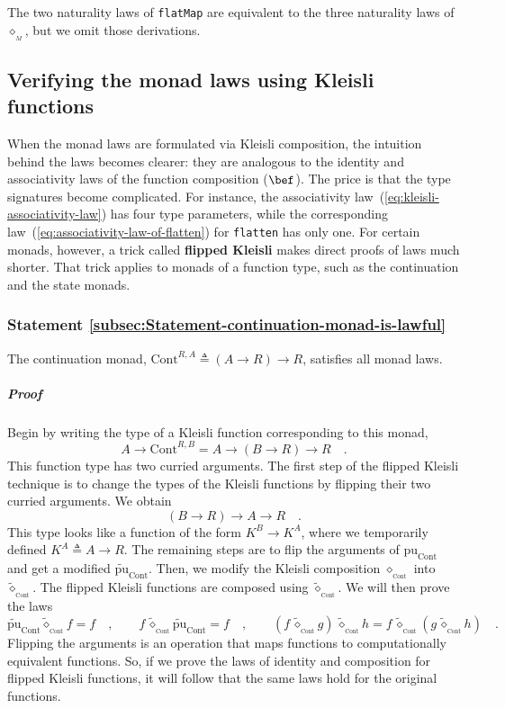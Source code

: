 The two naturality laws of \lstinline!flatMap! are equivalent to
the three naturality laws of $\diamond_{_{M}}$, but we omit those
derivations. 

\subsection{Verifying the monad laws using Kleisli functions}

When the monad laws are formulated via Kleisli composition, the intuition
behind the laws becomes clearer: they are analogous to the identity
and associativity laws of the function composition ($\bef$). The
price is that the type signatures become complicated. For instance,
the associativity law~(\ref{eq:kleisli-associativity-law}) has four
type parameters, while the corresponding law~(\ref{eq:associativity-law-of-flatten})
for \lstinline!flatten! has only one. For certain monads, however,
a trick called \textbf{flipped
Kleisli} makes direct proofs of laws much shorter. That trick applies
to monads of a function type, such as the continuation and the state
monads.

\subsubsection{Statement \label{subsec:Statement-continuation-monad-is-lawful}\ref{subsec:Statement-continuation-monad-is-lawful}}

The continuation monad, $\text{Cont}^{R,A}\triangleq\left(A\rightarrow R\right)\rightarrow R$,
satisfies all monad laws.

\subparagraph{Proof}

Begin by writing the type of a Kleisli function corresponding to this
monad,
\[
A\rightarrow\text{Cont}^{R,B}=A\rightarrow\left(B\rightarrow R\right)\rightarrow R\quad.
\]
This function type has two curried arguments. The first step of the
flipped Kleisli technique is to change the types of the Kleisli functions
by flipping their two curried arguments. We obtain
\[
\left(B\rightarrow R\right)\rightarrow A\rightarrow R\quad.
\]
This type looks like a function of the form $K^{B}\rightarrow K^{A}$,
where we temporarily defined $K^{A}\triangleq A\rightarrow R$. The
remaining steps are to flip the arguments of $\text{pu}_{\text{Cont}}$
and get a modified $\tilde{\text{pu}}_{\text{Cont}}$. Then, we modify
the Kleisli composition $\diamond_{_{\text{Cont}}}$ into $\tilde{\diamond}_{_{\text{Cont}}}$.
The flipped Kleisli functions are composed using $\tilde{\diamond}_{_{\text{Cont}}}$.
We will then prove the laws
\[
\tilde{\text{pu}}_{\text{Cont}}\tilde{\diamond}_{_{\text{Cont}}}f=f\quad,\quad\quad f\,\tilde{\diamond}_{_{\text{Cont}}}\tilde{\text{pu}}_{\text{Cont}}=f\quad,\quad\quad(f\,\tilde{\diamond}_{_{\text{Cont}}}g)\,\tilde{\diamond}_{_{\text{Cont}}}h=f\,\tilde{\diamond}_{_{\text{Cont}}}(g\,\tilde{\diamond}_{_{\text{Cont}}}h)\quad.
\]
Flipping the arguments is an operation that maps functions to computationally
equivalent functions. So, if we prove the laws of identity and composition
for flipped Kleisli functions, it will follow that the same laws hold
for the original functions.

